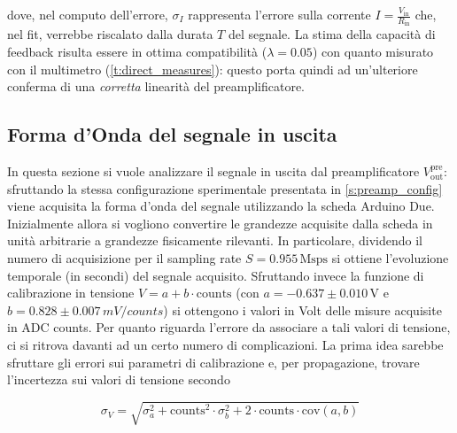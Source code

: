 \documentclass[a4paper,11pt]{article} %
\begin{document}
dove, nel computo dell'errore, $\sigma_I$ rappresenta l'errore sulla corrente $I =
\frac{V_{\text{in}}}{R_{\text{in}}}$ che, nel fit, verrebbe riscalato dalla durata $T$ del segnale. La stima della
capacità di feedback risulta essere in ottima compatibilità ($\lambda = 0.05$) con quanto misurato con il multimetro
(\autoref{t:direct_measures}): questo porta quindi ad un'ulteriore conferma di una \textit{corretta} linearità del
preamplificatore.


\subsection{Forma d'Onda del segnale in uscita}\label{s:preamp_waveform}

In questa sezione si vuole analizzare il segnale in uscita dal preamplificatore $V^{\text{pre}}_{\text{out}}$:
sfruttando la stessa configurazione sperimentale presentata in \autoref{s:preamp_config} viene acquisita la forma d'onda
del segnale utilizzando la scheda Arduino Due. Inizialmente allora si vogliono convertire le grandezze acquisite dalla
scheda in unità arbitrarie a grandezze fisicamente rilevanti. In particolare, dividendo il numero di acquisizione per il
sampling rate $S=0.955\,\text{Msps}$ si ottiene l'evoluzione temporale (in secondi) del segnale acquisito. Sfruttando
invece la funzione di calibrazione in tensione $V= a  +  b \cdot \text{counts}$ (con $a=-0.637 \pm 0.010\,\si{\volt}$ e
$b=0.828\pm0.007\,\si{mV/counts}$) si ottengono i valori in Volt delle misure acquisite in ADC counts. Per quanto
riguarda l'errore da associare a tali valori di tensione, ci si ritrova davanti ad un certo numero di complicazioni. La
prima idea sarebbe sfruttare gli errori sui parametri di calibrazione e, per propagazione, trovare l'incertezza sui
valori di tensione secondo 

\begin{equation}
	\sigma_{V} = \sqrt{\sigma_a^2 + \text{counts}^2 \cdot \sigma_b^2 + 2 \cdot \text{counts} \cdot \text{cov}(a,b)}
\end{equation}
\end{document}
